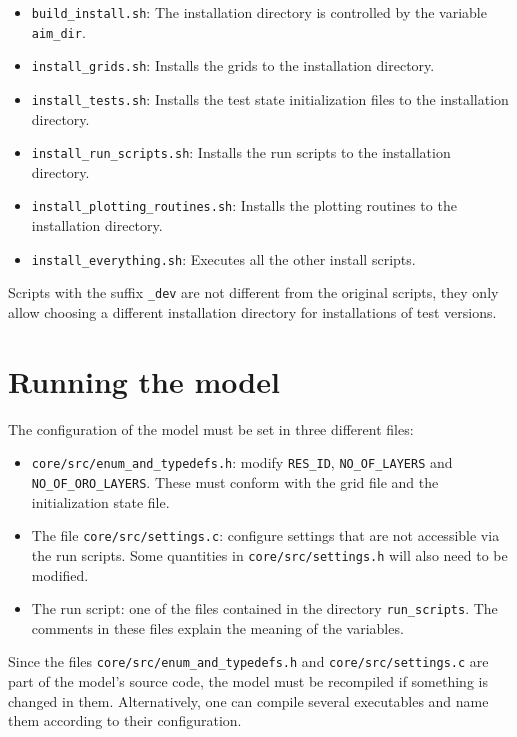 \documentclass[10pt]{report}
\begin{document}
\begin{itemize}
\item \texttt{build\_install.sh}: The installation directory is controlled by the variable \texttt{aim\_dir}.
\item \texttt{install\_grids.sh}: Installs the grids to the installation directory.
\item \texttt{install\_tests.sh}: Installs the test state initialization files to the installation directory.
\item \texttt{install\_run\_scripts.sh}: Installs the run scripts to the installation directory.
\item \texttt{install\_plotting\_routines.sh}: Installs the plotting routines to the installation directory.
\item \texttt{install\_everything.sh}: Executes all the other install scripts.
\end{itemize}

Scripts with the suffix \texttt{\_dev} are not different from the original scripts, they only allow choosing a different installation directory for installations of test versions.

\chapter{Running the model}
\label{chap:running_the_model}

The configuration of the model must be set in three different files:

\begin{itemize}
\item \texttt{core/src/enum\_and\_typedefs.h}: modify \texttt{RES\_ID}, \texttt{NO\_OF\_LAYERS} and \texttt{NO\_OF\_ORO\_LAYERS}. These must conform with the grid file and the initialization state file.
\item The file \texttt{core/src/settings.c}: configure  settings that are not accessible via the run scripts. Some quantities in \texttt{core/src/settings.h} will also need to be modified.
\item The run script: one of the files contained in the directory \texttt{run\_scripts}. The comments in these files explain the meaning of the variables.
\end{itemize}
%
Since the files \texttt{core/src/enum\_and\_typedefs.h} and \texttt{core/src/settings.c} are part of the model's source code, the model must be recompiled if something is changed in them. Alternatively, one can compile several executables and name them according to their configuration.
\end{document}
